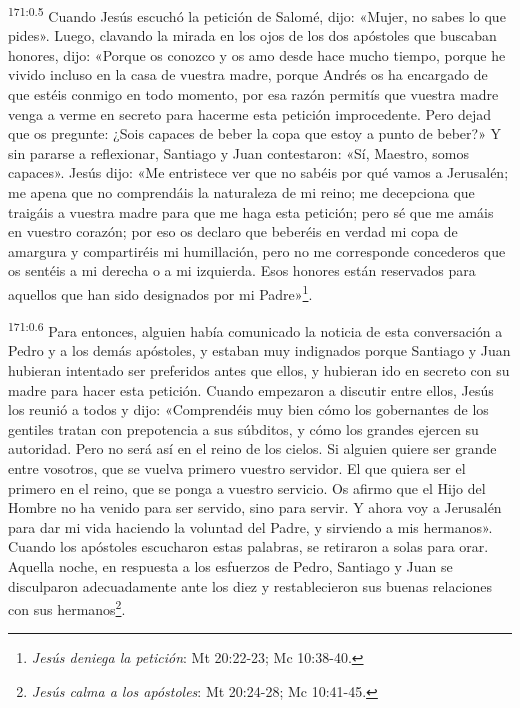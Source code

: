 \par 
\textsuperscript{171:0.5} Cuando Jesús escuchó la petición de Salomé, dijo: «Mujer, no sabes lo que pides». Luego, clavando la mirada en los ojos de los dos apóstoles que buscaban honores, dijo: «Porque os conozco y os amo desde hace mucho tiempo, porque he vivido incluso en la casa de vuestra madre, porque Andrés os ha encargado de que estéis conmigo en todo momento, por esa razón permitís que vuestra madre venga a verme en secreto para hacerme esta petición improcedente. Pero dejad que os pregunte: ¿Sois capaces de beber la copa que estoy a punto de beber?» Y sin pararse a reflexionar, Santiago y Juan contestaron: «Sí, Maestro, somos capaces». Jesús dijo: «Me entristece ver que no sabéis por qué vamos a Jerusalén; me apena que no comprendáis la naturaleza de mi reino; me decepciona que traigáis a vuestra madre para que me haga esta petición; pero sé que me amáis en vuestro corazón; por eso os declaro que beberéis en verdad mi copa de amargura y compartiréis mi humillación, pero no me corresponde concederos que os sentéis a mi derecha o a mi izquierda. Esos honores están reservados para aquellos que han sido designados por mi Padre»\footnote{\textit{Jesús deniega la petición}: Mt 20:22-23; Mc 10:38-40.}.

\par 
\textsuperscript{171:0.6} Para entonces, alguien había comunicado la noticia de esta conversación a Pedro y a los demás apóstoles, y estaban muy indignados porque Santiago y Juan hubieran intentado ser preferidos antes que ellos, y hubieran ido en secreto con su madre para hacer esta petición. Cuando empezaron a discutir entre ellos, Jesús los reunió a todos y dijo: «Comprendéis muy bien cómo los gobernantes de los gentiles tratan con prepotencia a sus súbditos, y cómo los grandes ejercen su autoridad. Pero no será así en el reino de los cielos. Si alguien quiere ser grande entre vosotros, que se vuelva primero vuestro servidor. El que quiera ser el primero en el reino, que se ponga a vuestro servicio. Os afirmo que el Hijo del Hombre no ha venido para ser servido, sino para servir. Y ahora voy a Jerusalén para dar mi vida haciendo la voluntad del Padre, y sirviendo a mis hermanos». Cuando los apóstoles escucharon estas palabras, se retiraron a solas para orar. Aquella noche, en respuesta a los esfuerzos de Pedro, Santiago y Juan se disculparon adecuadamente ante los diez y restablecieron sus buenas relaciones con sus hermanos\footnote{\textit{Jesús calma a los apóstoles}: Mt 20:24-28; Mc 10:41-45.}.

